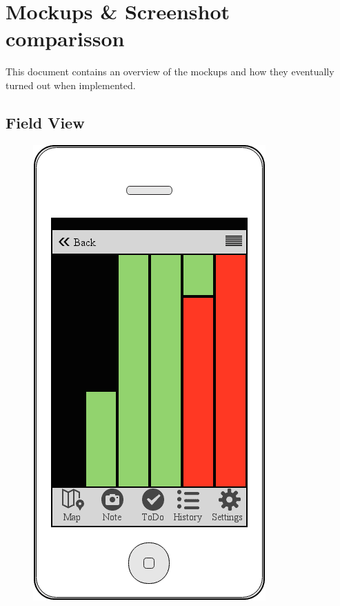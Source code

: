 \documentclass[12pt]{article}
\begin{document}
	\clearpage
	 \listoffigures
    \clearpage

	\tableofcontents
	\clearpage

\section{Mockups \& Screenshot comparisson}
This document contains an overview of the mockups and how they eventually turned out when implemented.
\subsection{Field View}
\begin{figure}[ht]
	\centering
	\includegraphics[width=\linewidth, height=0.4\textheight, keepaspectratio=true]{screenshots/Grutto.png}

\end{figure}
\end{document}
